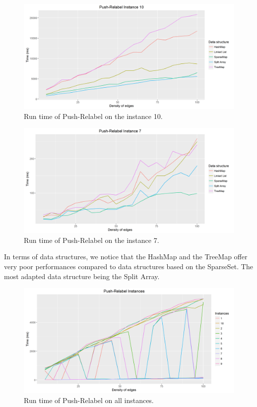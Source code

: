 \begin{figure}[H]
\includegraphics[scale=0.63]{images/PR10.png}
\caption{Run time of Push-Relabel on the instance 10.}
\label{fig:PR10}
\end{figure}
\begin{figure}[H]
\includegraphics[scale=0.63]{images/PR7.png}
\caption{Run time of Push-Relabel on the instance 7.}
\label{fig:PR7}
\end{figure}

In terms of data structures, we notice that the HashMap and the TreeMap offer very poor performances compared to data structures based on the SparseSet. The most adapted data structure being the Split Array.

\begin{figure}[H]
\includegraphics[scale=0.63]{images/PRmean.png}
\caption{Run time of Push-Relabel on all instances.}
\label{fig:PRmean}
\end{figure}

